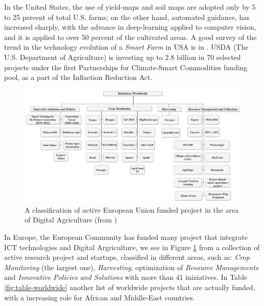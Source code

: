\documentclass[comsoc,final]{IEEEtran}
\begin{document}
In the United States, the use of yield-maps and soil maps are adopted only by 5 to 25 percent of total U.S. farms; on the other hand, automated guidance, has increased sharply, with the advance in deep-learning applied to computer vision, and it is applied to over 50 percent of the cultivated areas. A good survey of the trend in the technology evolution of a \emph{Smart Farm} in USA is in \cite{mcfadden2023precision}. USDA (The U.S. Department of Agriculture) is investing up to $2.8$ billion in $70$ selected projects under the first Partnerships for Climate-Smart Commodities funding pool, as a part of the Inflaction Reduction Act.


\begin{figure}
    \centering
    \includegraphics[width=\columnwidth]{agriengineering-04-00029-g005}
    \caption{A classification of active European Union funded project in the area of Digital Agriculture (from \cite{agriengineering4020029})}
    \label{fig:euprojects}
\end{figure}

In Europe, the European Community has funded many project that integrate ICT technologies and Digital Argriculture, we see in Figure \ref{fig:euprojects} from \cite{agriengineering4020029} a collection of active research project and startups, classified in different areas, such as:  \emph{Crop Monitoring}  (the largest one), \emph{Harvesting}, optimization of \emph{Resource Managements} and \emph{Innovative Policies and Solutions} with more than $41$ iniziatives. In Table \ref{fig:table-worldwide} another list of worldwide projects that are actually funded, with a increasing role for African and Middle-East countries.
\end{document}
